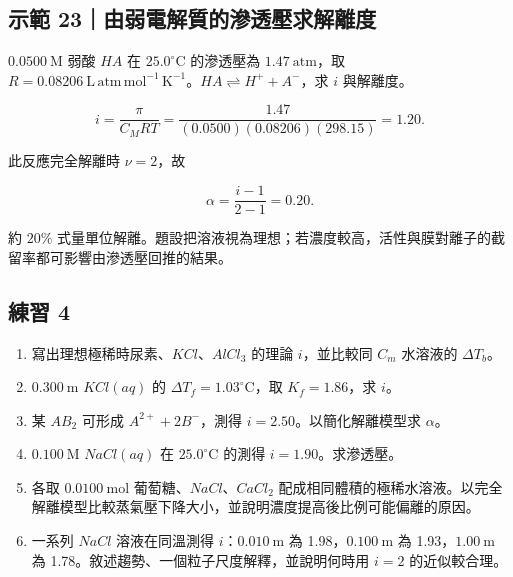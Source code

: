 \documentclass[11pt,a4paper]{article}
\providecommand{\tightlist}{%
  \setlength{\itemsep}{0pt}\setlength{\parskip}{0pt}}
\begin{document}
\begin{HandoutWorkedExample}

\subsection{示範 23｜由弱電解質的滲透壓求解離度}\label{ux793aux7bc4-23ux7531ux5f31ux96fbux89e3ux8ceaux7684ux6ef2ux900fux58d3ux6c42ux89e3ux96e2ux5ea6}

\(0.0500\ \mathrm M\) 弱酸 \(HA\) 在 \(25.0^\circ\mathrm C\) 的滲透壓為 \(1.47\ \mathrm{atm}\)，取 \(R=0.08206\ \mathrm{L\,atm\,mol^{-1}\,K^{-1}}\)。\(HA\rightleftharpoons H^++A^-\)，求 \(i\) 與解離度。

\[
i=\frac{\pi}{C_MRT}
=\frac{1.47}{(0.0500)(0.08206)(298.15)}=1.20.
\]

此反應完全解離時 \(\nu=2\)，故

\[
\alpha=\frac{i-1}{2-1}=0.20.
\]

約 \(20\%\) 式量單位解離。題設把溶液視為理想；若濃度較高，活性與膜對離子的截留率都可影響由滲透壓回推的結果。

\end{HandoutWorkedExample}

\subsection{練習 4}\label{ux7df4ux7fd2-4}

\begin{enumerate}
\def\labelenumi{\arabic{enumi}.}
\tightlist
\item
  寫出理想極稀時尿素、\(KCl\)、\(AlCl_3\) 的理論 \(i\)，並比較同 \(C_m\) 水溶液的 \(\Delta T_b\)。
\item
  \(0.300\ \mathrm m\) \(KCl(aq)\) 的 \(\Delta T_f=1.03^\circ\mathrm C\)，取 \(K_f=1.86\)，求 \(i\)。
\item
  某 \(AB_2\) 可形成 \(A^{2+}+2B^-\)，測得 \(i=2.50\)。以簡化解離模型求 \(\alpha\)。
\item
  \(0.100\ \mathrm M\) \(NaCl(aq)\) 在 \(25.0^\circ\mathrm C\) 的測得 \(i=1.90\)。求滲透壓。
\item
  各取 \(0.0100\ \mathrm{mol}\) 葡萄糖、\(NaCl\)、\(CaCl_2\) 配成相同體積的極稀水溶液。以完全解離模型比較蒸氣壓下降大小，並說明濃度提高後比例可能偏離的原因。
\item
  一系列 \(NaCl\) 溶液在同溫測得 \(i\)：\(0.010\ \mathrm m\) 為 1.98，\(0.100\ \mathrm m\) 為 1.93，\(1.00\ \mathrm m\) 為 1.78。敘述趨勢、一個粒子尺度解釋，並說明何時用 \(i=2\) 的近似較合理。
\end{enumerate}
\end{document}
